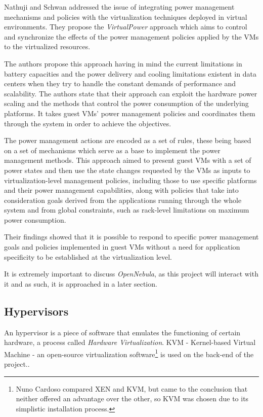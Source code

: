 Nathuji and Schwan addressed the issue of integrating power management mechanisms and policies with the virtualization techniques deployed in virtual environments. They propose the \textit{VirtualPower} approach which aims to control and synchronize the effects of the power management policies applied by the VMs to the virtualized resources. 

The authors propose this approach having in mind the current limitations in battery capacities and the power delivery and cooling limitations existent in data centers when they try to handle the constant demands of performance and scalability. The authors state that their approach  can exploit the hardware power scaling and the methods that control the power consumption of the underlying platforms. It takes guest VMs' power management policies and coordinates them through the system in order to achieve the objectives. 

The power management actions are encoded as a set of rules, these being based on a set of mechanisms which serve as a base to implement the power management methods. This approach aimed to present guest VMs with a set of power states and then use the state changes requested by the VMs as inputs to virtualization-level management policies, including those to use specific platforms and their power management capabilities, along with policies that take into consideration goals derived from the applications running through the whole system and from global constraints, such as rack-level limitations on maximum power consumption. 

Their findings showed that it is possible to respond to specific power management goals and policies implemented in guest VMs without a need for application specificity to be established at the virtualization level. \cite{virtualpower}

It is extremely important to discuss \textit{OpenNebula}, as this project will interact with it and as such, it is approached in a later section. \cite{opennebula}

\subsection{Hypervisors}\label{hyper}

An hypervisor is a piece of software that emulates the functioning of certain hardware, a process called \textit{Hardware Virtualization}. KVM - Kernel-based Virtual Machine - an open-source virtualization software\footnote{Nuno Cardoso compared XEN and KVM, but came to the conclusion that neither offered an advantage over the other, so KVM was chosen due to its simplistic installation process.} is used on the back-end of the project..

